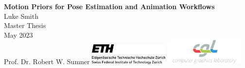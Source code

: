 \documentclass[a4paper,twoside,12pt,chapterprefix=false]{scrbook}
\begin{document}
%


\newcommand{\mfytext}[0]{my fancy text}
\newcommand{\TODO}[1]{\textcolor{red}{TODO: #1}}

\newcommand{\chpref}[1]{Chapter \ref{#1}}
\newcommand{\secref}[1]{Section \ref{#1}}
\newcommand{\figref}[1]{Figure \ref{#1}}
\newcommand{\tabref}[1]{Table \ref{#1}}
\newcommand{\apxref}[1]{Appendix \ref{#1}}

\hypersetup{pageanchor=false} %

%
\begin{titlepage}
	\topmargin 1.0cm
	\oddsidemargin 0.0cm
	\evensidemargin 0.0cm
	\centering
	\Huge
	\vspace{3.0cm}
	\textbf{\textsf{Motion Priors for Pose Estimation and Animation Workflows}} \\[2.0cm]
	\vspace{5.0cm}
	\sffamily
	\Large
	Luke Smith
	\\[0.8cm]
	\large
	Master Thesis
	\\
	May 2023
	\\[1.3cm]
	Prof. Dr. Robert W. Sumner
	\vfill
	\includegraphics*[width=0.3\textwidth]{Figures/ETH_logo} \hfill
	\includegraphics*[width=0.3\textwidth]{Figures/CGL_logo}
	\vspace{3.4cm}
\end{titlepage}
\clearemptydoublepage
\end{document}
